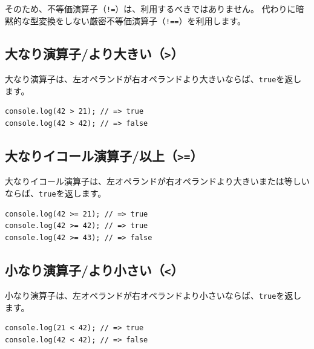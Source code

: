 そのため、不等価演算子（\texttt{!=}）は、利用するべきではありません。
代わりに暗黙的な型変換をしない厳密不等価演算子（\texttt{!==}）を利用します。

\hypertarget{more-than}{%
\subsection{\texorpdfstring{大なり演算子/より大きい（\texttt{\textgreater{}}）}{大なり演算子/より大きい（\textgreater{}）}}\label{more-than}}

大なり演算子は、左オペランドが右オペランドより大きいならば、\texttt{true}を返します。

\begin{lstlisting}
console.log(42 > 21); // => true
console.log(42 > 42); // => false
\end{lstlisting}

\hypertarget{more-than-equal}{%
\subsection{\texorpdfstring{大なりイコール演算子/以上（\texttt{\textgreater{}=}）}{大なりイコール演算子/以上（\textgreater{}=）}}\label{more-than-equal}}

大なりイコール演算子は、左オペランドが右オペランドより大きいまたは等しいならば、\texttt{true}を返します。

\begin{lstlisting}
console.log(42 >= 21); // => true
console.log(42 >= 42); // => true
console.log(42 >= 43); // => false
\end{lstlisting}

\hypertarget{less-than}{%
\subsection{\texorpdfstring{小なり演算子/より小さい（\texttt{\textless{}}）}{小なり演算子/より小さい（\textless{}）}}\label{less-than}}

小なり演算子は、左オペランドが右オペランドより小さいならば、\texttt{true}を返します。

\begin{lstlisting}
console.log(21 < 42); // => true
console.log(42 < 42); // => false
\end{lstlisting}

